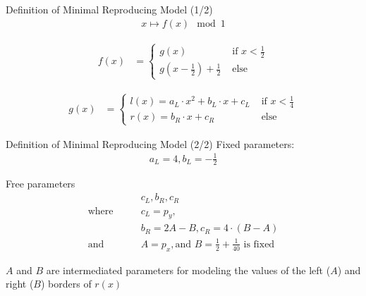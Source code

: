 \begin{frame}{Definition of Minimal Reproducing Model (1/2)}
    \vspace{-3.0em}
    \begin{align}
        x \mapsto f(x) \mod 1
    \end{align}

    \begin{align}
        f(x) & = \begin{cases}
                     g(x)                                        & \text{ if } x < \frac{1}{2} \\
                     g\left(x - \frac{1}{2}\right) + \frac{1}{2} & \text{ else}
                 \end{cases}
    \end{align}

    \begin{align}
        g(x) & = \begin{cases}
                     l(x) = a_L \cdot x^2 + b_L \cdot x + c_L & \text{ if } x < \frac{1}{4} \\
                     r(x) = b_R \cdot x + c_R                 & \text{ else}
                 \end{cases}
    \end{align}
\end{frame}

\begin{frame}{Definition of Minimal Reproducing Model (2/2)}
    Fixed parameters:
    \begin{align*}
        a_L = 4, b_L = -\frac{1}{2}
    \end{align*}

    Free parameters
    \begin{align*}
         & c_L, b_R, c_R                                                        \\
        \text{where} \qquad
         & c_L = p_y,                                                           \\
         & b_R = 2A - B, c_R = 4 \cdot (B - A)                                  \\
        \text {and} \qquad
         & A = p_x, \text{and } B = \frac{1}{2} + \frac{1}{40} \text{ is fixed}
    \end{align*}

    $A$ and $B$ are intermediated parameters for modeling the values of the left ($A$) and right ($B$) borders of $r(x)$
\end{frame}

